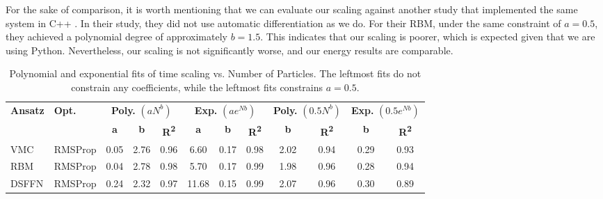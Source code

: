 For the sake of comparison, it is worth mentioning that we can evaluate our scaling against another study that implemented the same system in C++ \cite{Nordhagen2019}. In their study, they did not use automatic differentiation as we do. For their RBM, under the same constraint of $a=0.5$, they achieved a polynomial degree of approximately $b = 1.5$. This indicates that our scaling is poorer, which is expected given that we are using Python. Nevertheless, our scaling is not significantly worse, and our energy results are comparable.

\begin{table}[h!]
\centering
\caption{Polynomial and exponential fits of time scaling vs. Number of Particles. The leftmost fits do not constrain any coefficients, while the leftmost fits constrains $a = 0.5$.}
\begin{tabular}{llcccccc|cccc}
\toprule
\textbf{Ansatz} & \textbf{Opt.} & \multicolumn{3}{c}{\textbf{Poly.} $(aN^b)$} & \multicolumn{3}{c}{\textbf{Exp.} $(ae^ {Nb})$} & \multicolumn{2}{c}{\textbf{Poly.} $(0.5N^b)$} & \multicolumn{2}{c}{\textbf{Exp.} $(0.5e^ {Nb})$} \\
\cmidrule(lr){3-5} \cmidrule(lr){6-8} \cmidrule(lr){9-10} \cmidrule(lr){11-12}
& & \textbf{a} & \textbf{b} & \textbf{R\textsuperscript{2}} & \textbf{a} & \textbf{b} & \textbf{R\textsuperscript{2}} & \textbf{b} & \textbf{R\textsuperscript{2}} & \textbf{b} & \textbf{R\textsuperscript{2}} \\
\midrule
VMC & RMSProp & 0.05 & 2.76 & 0.96 & 6.60 & 0.17 & 0.98 & 2.02 & 0.94 & 0.29 & 0.93 \\
\midrule
RBM & RMSProp & 0.04 & 2.78 & 0.98 & 5.70 & 0.17 & 0.99 & 1.98 & 0.96 & 0.28 & 0.94 \\
\midrule
DSFFN & RMSProp & 0.24 & 2.32 & 0.97 & 11.68 & 0.15 & 0.99 & 2.07 & 0.96 & 0.30 & 0.89 \\
\bottomrule
\end{tabular}
\label{tab:time_scalling2d}
\end{table}